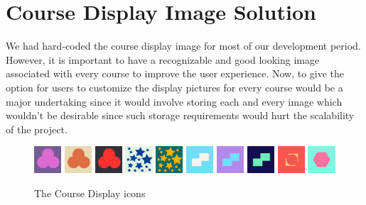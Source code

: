 \documentclass{article}
\begin{document}
\section{Course Display Image Solution}
We had hard-coded the course display image for most of our development period. However, it is important to have a recognizable and good looking image associated with every course to improve the user experience. Now, to give the option for users to customize the display pictures for every course would be a major undertaking since it would involve storing each and every image which wouldn't be desirable since such storage requirements would hurt the scalability of the project.
\begin{figure}[h]
    \centering
    \includegraphics[width=0.09\textwidth]{course-img1.png}
    \includegraphics[width=0.09\textwidth]{course-img2.png}
    \includegraphics[width=0.09\textwidth]{course-img3.png}
    \includegraphics[width=0.09\textwidth]{course-img4.png}
    \includegraphics[width=0.09\textwidth]{course-img5.png}
    \includegraphics[width=0.09\textwidth]{course-img6.png}
    \includegraphics[width=0.09\textwidth]{course-img7.png}
    \includegraphics[width=0.09\textwidth]{course-img8.png}
    \includegraphics[width=0.09\textwidth]{course-img9.png}
    \includegraphics[width=0.09\textwidth]{course-img10.png}
    \caption{The Course Display icons}
    \label{fig:UseCase}
\end{figure}
\end{document}
